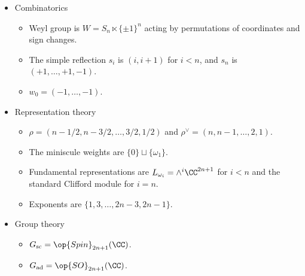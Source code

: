 \documentclass{article}
\begin{document}
\begin{itemize}
	\begin{itemize}
		\item The positive roots are $\{e_i-e_j:i<j\}\cup\{e_i+e_j:i<j\}\cup\{e_i:i\}$.
		\item The simple roots are $\{e_i-e_{i+1}:i\}\cup\{e_n\}$. Set $\alpha_i\coloneqq e_i-e_{i+1}$ and $\alpha_n\coloneqq e_n$.
		\item Dynkin diagram:
		\[\begin{tikzcd}[cramped]
			{\alpha_1} & {\alpha_2} & \cdots & {\alpha_{n-1}} & {\alpha_n}
			\arrow[no head, from=1-1, to=1-2]
			\arrow[no head, from=1-2, to=1-3]
			\arrow[no head, from=1-3, to=1-4]
			\arrow[Leftarrow, nfold, from=1-5, to=1-4]
		\end{tikzcd}\]
		\item The fundamental weights are $\{\omega_i\}_i$ where $\omega_i\coloneqq({1,\ldots,1},0,\ldots,0)$ has $i$ ones for $i<n$ and $\omega_n\coloneqq\frac12(1,\ldots,1)$.
		\item Maximal root $\theta=e_1+e_2$.
	\end{itemize}
	\item Combinatorics
	\begin{itemize}
		\item Weyl group is $W=S_{n}\ltimes\{\pm1\}^n$ acting by permutations of coordinates and sign changes.
		\item The simple reflection $s_i$ is $(i,i+1)$ for $i<n$, and $s_n$ is $(+1,\ldots,+1,-1)$.
		\item $w_0=(-1,\ldots,-1)$.
	\end{itemize}
	\item Representation theory
	\begin{itemize}
		\item $\rho=(n-1/2,n-3/2,\ldots,3/2,1/2)$ and $\rho^\lor=(n,n-1,\ldots,2,1)$.
		\item The miniscule weights are $\{0\}\sqcup\{\omega_1\}$.
		\item Fundamental representations are $L_{\omega_i}=\land^i\CC^{2n+1}$ for $i<n$ and the standard Clifford module for $i=n$.
		\item Exponents are $\{1,3,\ldots,2n-3,2n-1\}$.
	\end{itemize}
	\item Group theory
	\begin{itemize}
		\item $G_{\mathrm{sc}}=\op{Spin}_{2n+1}(\CC)$.
		\item $G_{\mathrm{ad}}=\op{SO}_{2n+1}(\CC)$.
	\end{itemize}
\end{itemize}
\end{document}

